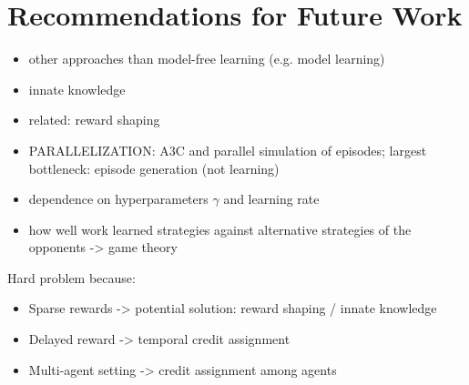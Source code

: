 \chapter{Recommendations for Future Work}
\label{ch:future_work}
\begin{itemize}
    \item other approaches than model-free learning (e.g. model learning)
    \item innate knowledge
    \item related: reward shaping
    \item PARALLELIZATION: A3C and parallel simulation of episodes; largest bottleneck: episode generation (not learning)
    \item dependence on hyperparameters $\gamma$ and learning rate
    \item how well work learned strategies against alternative strategies of the opponents -> game theory
\end{itemize}
Hard problem because:
\begin{itemize}
    \item Sparse rewards -> potential solution: reward shaping / innate knowledge
    \item Delayed reward -> temporal credit assignment
    \item Multi-agent setting -> credit assignment among agents
\end{itemize}